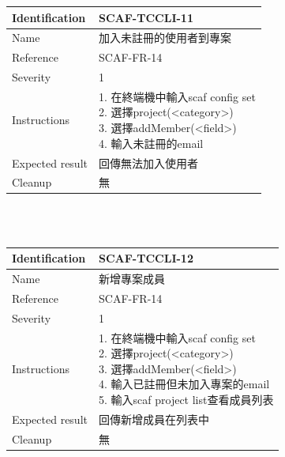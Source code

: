 \documentclass{report}
\begin{document}
\begin{tabularx}{\textwidth}{
  |p{}%
  |p{}|%
  }
  \hline
  \centering Identification &  SCAF-TCCLI-11 \\
  \hline
  \centering Name & 加入未註冊的使用者到專案 \\
  \hline
  \centering Reference & SCAF-FR-14 \\
  \hline
  \centering Severity & 1 \\
  \hline
  \centering Instructions & 
  \makecell[l]{
    1. 在終端機中輸入scaf config set \\
    2. 選擇project(<category>) \\
    3. 選擇addMember(<field>)\\
    4. 輸入未註冊的email \\
  }\\
  \hline
  \centering Expected result & 回傳無法加入使用者 \\
  \hline
  \centering Cleanup & 無 \\
  \hline
\end{tabularx}
\\
\newline
\\

\begin{tabularx}{\textwidth}{
  |p{}%
  |p{}|%
  }
  \hline
  \centering Identification &  SCAF-TCCLI-12 \\
  \hline
  \centering Name & 新增專案成員 \\
  \hline
  \centering Reference & SCAF-FR-14 \\
  \hline
  \centering Severity & 1 \\
  \hline
  \centering Instructions & 
  \makecell[l]{
    1. 在終端機中輸入scaf config set \\
    2. 選擇project(<category>) \\
    3. 選擇addMember(<field>)\\
    4. 輸入已註冊但未加入專案的email \\
    5. 輸入scaf project list查看成員列表 \\
  }\\
  \hline
  \centering Expected result & 回傳新增成員在列表中 \\
  \hline
  \centering Cleanup & 無 \\
  \hline
\end{tabularx}
\\
\newline
\\
\end{document}
